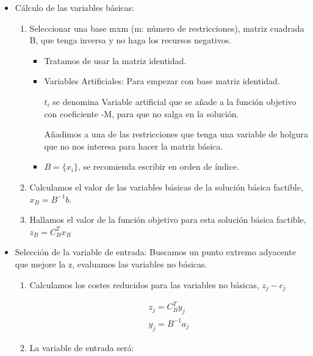 \documentclass[12pt, twoside, openright]{report} %
\begin{document}
\begin{itemize}
	\item Cálculo de las variables básicas:

	      \begin{enumerate}
		      \def\labelenumi{\arabic{enumi}.}
		      \item Seleccionar una base mxm (m: número de restricciones), matriz
		            cuadrada B, que tenga inversa y no haga los recursos negativos.

		            \begin{itemize}
			            \item Tratamos de usar la matriz identidad.
			            \item Variables Artificiales: Para empezar con base matriz
			                  identidad.

			                  \(t_i\) se denomina Variable artificial que se añade a la
			                  función objetivo con coeficiente -M, para que no salga en la
			                  solución.

			                  Añadimos a una de las restricciones que tenga una variable
			                  de holgura que no nos interesa para hacer la matriz básica.
			            \item \(B = \{ x_i \}\), se recomienda escribir en orden de índice.
		            \end{itemize}
		      \item Calculamos el valor de las variables básicas de la solución
		            básica factible, \(x_B=B^{-1}b\).
		      \item Hallamos el valor de la función objetivo para esta solución
		            básica factible, \(z_B=C_B^Tx_B\)
	      \end{enumerate}
	\item Selección de la variable de entrada: Buscamos un punto extremo
	      adyacente que mejore la z, evaluamos las variables no básicas.

	      \begin{enumerate}
		      \def\labelenumi{\arabic{enumi}.}
		      \item Calculamos los costes reducidos para las variables no básicas,
		            \(z_j-c_j\)

		            $$\begin{matrix}
				            z_j=C_B^Ty_j  \\
				            y_j=B^{-1}a_j
			            \end{matrix}$$
		      \item La variable de entrada será:


\end{enumerate}
\end{itemize}
\end{document}
